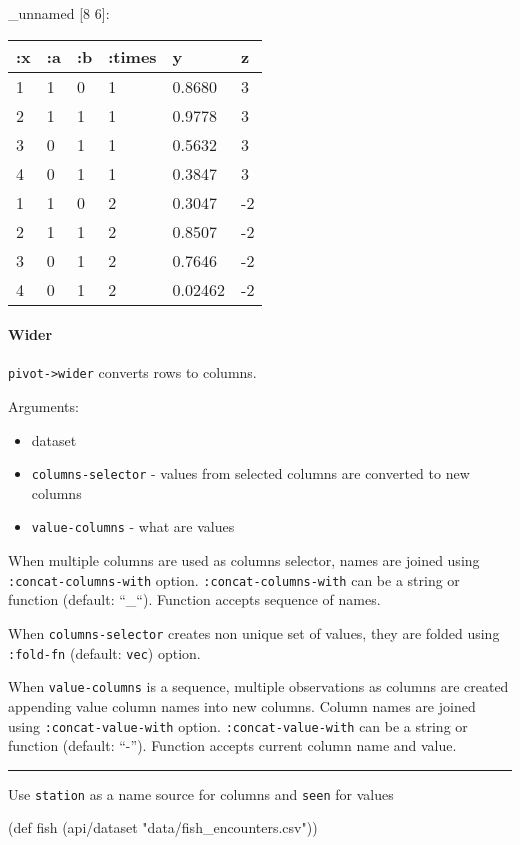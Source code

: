 \documentclass[]{article}
\newenvironment{Shaded}{\begin{snugshade}}{\end{snugshade}}
\newcommand{\StringTok}[1]{\textcolor[rgb]{0.31,0.60,0.02}{#1}}
\newcommand{\FunctionTok}[1]{\textcolor[rgb]{0.00,0.00,0.00}{#1}}
\newcommand{\BuiltInTok}[1]{#1}
\newcommand{\NormalTok}[1]{#1}
\providecommand{\tightlist}{%
  \setlength{\itemsep}{0pt}\setlength{\parskip}{0pt}}
\let\oldparagraph\paragraph
\renewcommand{\paragraph}[1]{\oldparagraph{#1}\mbox{}}
\begin{document}
\_unnamed {[}8 6{]}:

\begin{longtable}[]{@{}llllll@{}}
\toprule
:x & :a & :b & :times & y & z\tabularnewline
\midrule
\endhead
1 & 1 & 0 & 1 & 0.8680 & 3\tabularnewline
2 & 1 & 1 & 1 & 0.9778 & 3\tabularnewline
3 & 0 & 1 & 1 & 0.5632 & 3\tabularnewline
4 & 0 & 1 & 1 & 0.3847 & 3\tabularnewline
1 & 1 & 0 & 2 & 0.3047 & -2\tabularnewline
2 & 1 & 1 & 2 & 0.8507 & -2\tabularnewline
3 & 0 & 1 & 2 & 0.7646 & -2\tabularnewline
4 & 0 & 1 & 2 & 0.02462 & -2\tabularnewline
\bottomrule
\end{longtable}

\paragraph{Wider}\label{wider}

\texttt{pivot-\textgreater{}wider} converts rows to columns.

Arguments:

\begin{itemize}
\tightlist
\item
  dataset
\item
  \texttt{columns-selector} - values from selected columns are converted
  to new columns
\item
  \texttt{value-columns} - what are values
\end{itemize}

When multiple columns are used as columns selector, names are joined
using \texttt{:concat-columns-with} option.
\texttt{:concat-columns-with} can be a string or function (default:
``\_``). Function accepts sequence of names.

When \texttt{columns-selector} creates non unique set of values, they
are folded using \texttt{:fold-fn} (default: \texttt{vec}) option.

When \texttt{value-columns} is a sequence, multiple observations as
columns are created appending value column names into new columns.
Column names are joined using \texttt{:concat-value-with} option.
\texttt{:concat-value-with} can be a string or function (default:
``-''). Function accepts current column name and value.

\begin{center}\rule{0.5\linewidth}{0.5pt}\end{center}

Use \texttt{station} as a name source for columns and \texttt{seen} for
values

\begin{Shaded}
\begin{Highlighting}[]
\NormalTok{(}\BuiltInTok{def}\FunctionTok{ fish }\NormalTok{(api/dataset }\StringTok{"data/fish_encounters.csv"}\NormalTok{))}
\end{Highlighting}
\end{Shaded}
\end{document}
